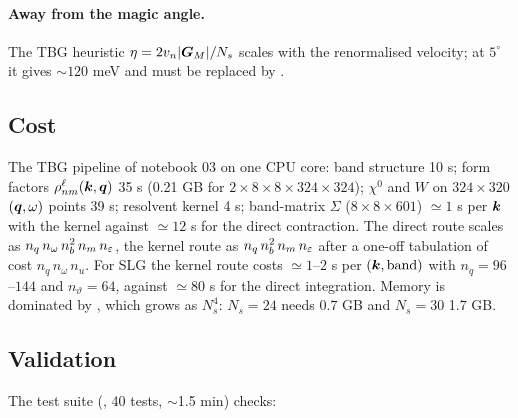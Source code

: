 \paragraph{Away from the magic angle.} The TBG heuristic $\eta=2v_n|\bm G_M|/N_s$ scales with the renormalised
velocity; at $5^\circ$ it gives $\sim120$ meV and must be replaced by .

\subsection{Cost}

The TBG pipeline of notebook 03 on one CPU core: band structure 10 s; form factors $\rho^\ell_{nm}(\bm k,\bm q)$ 35 s
(0.21 GB for $2\times8\times8\times324\times324$); $\chi^0$ and $W$ on $324\times320$ $(\bm q,\omega)$ points 39 s; resolvent
kernel 4 s; band-matrix $\Sigma$ ($8\times8\times601$) $\simeq1$ s per $\bm k$ with the kernel against $\simeq12$ s for the
direct contraction. The direct route scales as $n_q\,n_\omega\,n_b^2\,n_m\,n_\varepsilon$, the kernel route as
$n_q\,n_b^2\,n_m\,n_\varepsilon$ after a one-off tabulation of cost $n_q\,n_\omega\,n_u$. For SLG the kernel route costs $\simeq1$--$2$ s per $(\bm k,\text{band})$ with $n_q=96$--$144$ and $n_\vartheta=64$, against
$\simeq80$ s for the direct integration. Memory is dominated by
, which grows as $N_s^4$: $N_s=24$ needs $0.7$ GB and $N_s=30$ 1.7 GB.

\subsection{Validation}

The test suite (, 40 tests, $\sim$1.5 min) checks:


